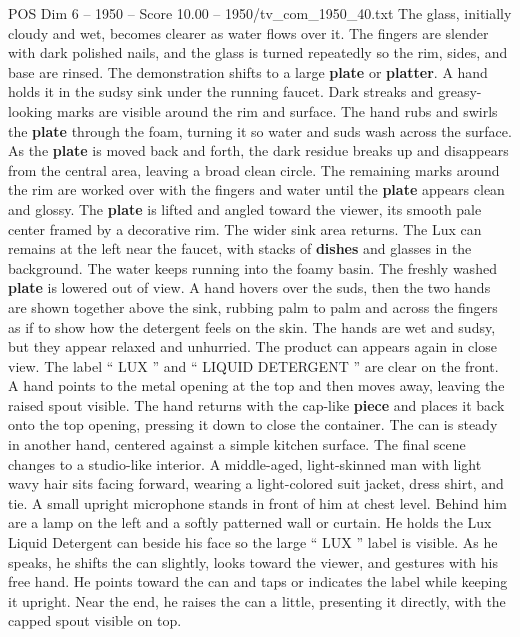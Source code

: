\begin{textsample}{POS Dim 6 – 1950 – Score 10.00 – 1950/tv\_com\_1950\_40.txt}
The glass, initially cloudy and wet, becomes clearer as water flows over it.
The fingers are slender with dark polished nails, and the glass is turned repeatedly so the rim, sides, and base are rinsed.
The demonstration shifts to a large \textbf{plate} or \textbf{platter}.
A hand holds it in the sudsy sink under the running faucet.
Dark streaks and greasy-looking marks are visible around the rim and surface.
The hand rubs and swirls the \textbf{plate} through the foam, turning it so water and suds wash across the surface.
As the \textbf{plate} is moved back and forth, the dark residue breaks up and disappears from the central area, leaving a broad clean circle.
The remaining marks around the rim are worked over with the fingers and water until the \textbf{plate} appears clean and glossy.
The \textbf{plate} is lifted and angled toward the viewer, its smooth pale center framed by a decorative rim.
The wider sink area returns.
The Lux can remains at the left near the faucet, with stacks of \textbf{dishes} and glasses in the background.
The water keeps running into the foamy basin.
The freshly washed \textbf{plate} is lowered out of view.
A hand hovers over the suds, then the two hands are shown together above the sink, rubbing palm to palm and across the fingers as if to show how the detergent feels on the skin.
The hands are wet and sudsy, but they appear relaxed and unhurried.
The product can appears again in close view.
The label “ LUX ” and “ LIQUID DETERGENT ” are clear on the front.
A hand points to the metal opening at the top and then moves away, leaving the raised spout visible.
The hand returns with the cap-like \textbf{piece} and places it back onto the top opening, pressing it down to close the container.
The can is steady in another hand, centered against a simple kitchen surface.
The final scene changes to a studio-like interior.
A middle-aged, light-skinned man with light wavy hair sits facing forward, wearing a light-colored suit jacket, dress shirt, and tie.
A small upright microphone stands in front of him at chest level.
Behind him are a lamp on the left and a softly patterned wall or curtain.
He holds the Lux Liquid Detergent can beside his face so the large “ LUX ” label is visible.
As he speaks, he shifts the can slightly, looks toward the viewer, and gestures with his free hand.
He points toward the can and taps or indicates the label while keeping it upright.
Near the end, he raises the can a little, presenting it directly, with the capped spout visible on top.

\end{textsample}
